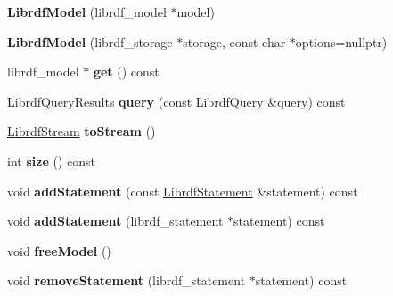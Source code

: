 \begin{DoxyCompactItemize}
{\bfseries Librdf\+Model} (librdf\+\_\+model $\ast$model)
\item 
\mbox{\label{classredland_1_1LibrdfModel_a355e16664fa50a8a3085f4070347106f}} 
{\bfseries Librdf\+Model} (librdf\+\_\+storage $\ast$storage, const char $\ast$options=nullptr)
\item 
\mbox{\label{classredland_1_1LibrdfModel_ae1b996f1785adfe9b4a1824a73643248}} 
librdf\+\_\+model $\ast$ {\bfseries get} () const
\item 
\mbox{\label{classredland_1_1LibrdfModel_a9bbced9329b4b9ef915789a37bf857b6}} 
\hyperlink{classredland_1_1LibrdfQueryResults}{Librdf\+Query\+Results} {\bfseries query} (const \hyperlink{classredland_1_1LibrdfQuery}{Librdf\+Query} \&query) const
\item 
\mbox{\label{classredland_1_1LibrdfModel_a646ed92896c4030de31c9e17b881bd2a}} 
\hyperlink{classredland_1_1LibrdfStream}{Librdf\+Stream} {\bfseries to\+Stream} ()
\item 
\mbox{\label{classredland_1_1LibrdfModel_a3067eb5bae1353ab5c86f135c4b401ad}} 
int {\bfseries size} () const
\item 
\mbox{\label{classredland_1_1LibrdfModel_a2b565a7d705e24d6163c068a40040087}} 
void {\bfseries add\+Statement} (const \hyperlink{classredland_1_1LibrdfStatement}{Librdf\+Statement} \&statement) const
\item 
\mbox{\label{classredland_1_1LibrdfModel_a643c3e3d3363f4f06330ede73dc19514}} 
void {\bfseries add\+Statement} (librdf\+\_\+statement $\ast$statement) const
\item 
\mbox{\label{classredland_1_1LibrdfModel_ad145b8f46be49434bb8bd0b90a904770}} 
void {\bfseries free\+Model} ()
\item 
\mbox{\label{classredland_1_1LibrdfModel_a807784594a1515e5633ec7d08858dd57}} 
void {\bfseries remove\+Statement} (librdf\+\_\+statement $\ast$statement) const
\item 

\end{DoxyCompactItemize}

